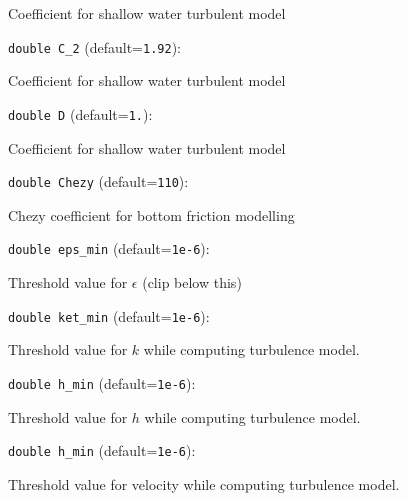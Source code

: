 Coefficient for shallow water turbulent model

\item\verb+double C_2+ {\rm(default=\verb|1.92|)}:

Coefficient for shallow water turbulent model

\item\verb+double D+ {\rm(default=\verb|1.|)}:

Coefficient for shallow water turbulent model

\item\verb+double Chezy+ {\rm(default=\verb|110|)}:

Chezy coefficient for bottom friction modelling

\item\verb+double eps_min+ {\rm(default=\verb|1e-6|)}:

Threshold value for $\epsilon$ (clip below this)

\item\verb+double ket_min+ {\rm(default=\verb|1e-6|)}:

Threshold value for $k$ while computing turbulence model.

\item\verb+double h_min+ {\rm(default=\verb|1e-6|)}:

Threshold value for $h$ while computing turbulence model.

\item\verb+double h_min+ {\rm(default=\verb|1e-6|)}:

Threshold value for velocity while computing turbulence model.

